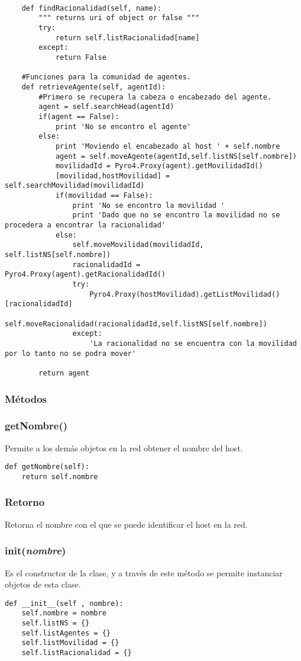 \documentclass{article}
\begin{document}
\begin{lstlisting}
    
    def findRacionalidad(self, name):
        """ returns uri of object or false """
        try:
            return self.listRacionalidad[name]
        except:
            return False     
    
    #Funciones para la comunidad de agentes.
    def retrieveAgente(self, agentId):
        #Primero se recupera la cabeza o encabezado del agente.
        agent = self.searchHead(agentId)
        if(agent == False):
            print 'No se encontro el agente'
        else:
            print 'Moviendo el encabezado al host ' + self.nombre
            agent = self.moveAgente(agentId,self.listNS[self.nombre])
            movilidadId = Pyro4.Proxy(agent).getMovilidadId()
            [movilidad,hostMovilidad] = self.searchMovilidad(movilidadId)
            if(movilidad == False):
                print 'No se encontro la movilidad '
                print 'Dado que no se encontro la movilidad no se procedera a encontrar la racionalidad'
            else:
                self.moveMovilidad(movilidadId, self.listNS[self.nombre])
                racionalidadId = Pyro4.Proxy(agent).getRacionalidadId()
                try:
                    Pyro4.Proxy(hostMovilidad).getListMovilidad()[racionalidadId]
                    self.moveRacionalidad(racionalidadId,self.listNS[self.nombre])
                except:
                    'La racionalidad no se encuentra con la movilidad por lo tanto no se podra mover'
                    
        return agent
\end{lstlisting}
\subsubsection*{Métodos}
\subsubsection{\textbf{getNombre}()}
Permite a los demás objetos en la red obtener el nombre del host.
\begin{lstlisting}
def getNombre(self):
	return self.nombre
\end{lstlisting}
\subsubsection*{Retorno}
Retorna el nombre con el que se puede identificar el host en la red.
\subsubsection{\textbf{init}(\textit{nombre})}
Es el constructor de la clase, y a través de este método se permite instanciar objetos de esta clase.
\begin{lstlisting}
def __init__(self , nombre):   
	self.nombre = nombre
    self.listNS = {}
	self.listAgentes = {}
    self.listMovilidad = {}
	self.listRacionalidad = {}
\end{lstlisting}
\end{document}

